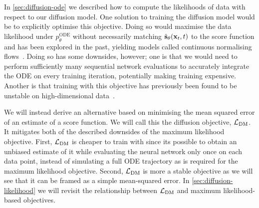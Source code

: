 In \cref{sec:diffusion-ode} we described how to compute the likelihoods of data with respect to our diffusion model. One solution to training the diffusion model would be to explicitly optimise this objective. Doing so would maximise the data likelihood under $p_\theta^\text{ODE}$ without necessarily matching $\hat{{\mathbf{s}}}_\theta({\mathbf{x}}_t, t)$ to the score function and has been explored in the past, yielding models called continuous normalising flows~\cite{chen2018neural}. Doing so has some downsides, however; one is that we would need to perform sufficiently many sequential network evaluations to accurately integrate the ODE on every training iteration, potentially making training expensive. Another is that training with this objective has previously been found to be unstable on high-dimensional data~\citep{weilbach2020structured}. 

We will instead derive an alternative based on minimising the mean squared error of an estimate of a score function. 
We will call this the diffusion objective, ${\mathcal{L}}_\text{DM}$. It mitigates both of the described downsides of the maximum likelihood objective. First, ${\mathcal{L}}_\text{DM}$ is cheaper to train with since its possible to obtain an unbiased estimate of it while evaluating the neural network only once on each data point, instead of simulating a full ODE trajectory as is required for the maximum likelihood objective. Second, ${\mathcal{L}}_\text{DM}$ is more a stable objective as we will see that it can be framed as a simple mean-squared error. In \cref{sec:diffusion-likelihood} we will revisit the relationship between ${\mathcal{L}}_\text{DM}$ and maximum likelihood-based objectives.


